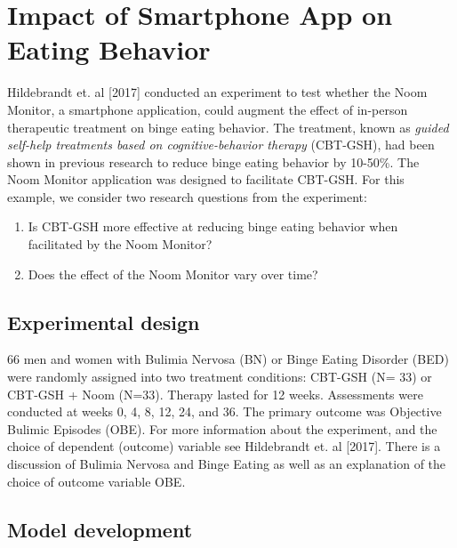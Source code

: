 \documentclass{article}
\begin{document}
\section{Impact of Smartphone App on Eating Behavior}
Hildebrandt et. al [2017] conducted an experiment to test whether the Noom Monitor, a smartphone application, could augment the effect of in-person therapeutic treatment on binge eating behavior.  The treatment, known as \emph{guided self-help treatments based on cognitive-behavior therapy} (CBT-GSH), had been shown in previous research to reduce binge eating behavior by 10-50\%.  The Noom Monitor application was designed to facilitate CBT-GSH.  For this example, we consider two research questions from the experiment:
\begin{enumerate}
\item{Is CBT-GSH more effective at reducing binge eating behavior when facilitated by the Noom Monitor?}
\item{Does the effect of the Noom Monitor vary over time?}
\end{enumerate}

\subsection{Experimental design}

66 men and women with Bulimia Nervosa (BN) or Binge Eating Disorder (BED) were randomly assigned into two treatment conditions: CBT-GSH (N= 33) or CBT-GSH + Noom (N=33).  Therapy lasted for 12 weeks.  Assessments were conducted at weeks 0, 4, 8, 12, 24, and 36.  The primary outcome was Objective Bulimic Episodes (OBE).  For more information about the experiment, and the choice of dependent (outcome) variable see Hildebrandt et. al [2017]. There is a discussion of Bulimia Nervosa and Binge Eating as well as an explanation of the choice of outcome variable OBE.

\subsection{Model development}
\end{document}
